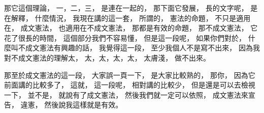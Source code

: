 \hypertarget{w02:cue:2688}{}那它這個理論，
\hypertarget{w02:cue:2689}{}一，二，三，
\hypertarget{w02:cue:2690}{}是連在一起的，
\hypertarget{w02:cue:2691}{}那下面它發展，
\hypertarget{w02:cue:2692}{}長的文字呢，
\hypertarget{w02:cue:2693}{}是在解釋，
\hypertarget{w02:cue:2694}{}什麼情況，
\hypertarget{w02:cue:2695}{}我現在講的這一套，
\hypertarget{w02:cue:2696}{}所謂的，
\hypertarget{w02:cue:2697}{}憲法的命題，
\hypertarget{w02:cue:2698}{}不只是適用在，
\hypertarget{w02:cue:2699}{}成文憲法，
\hypertarget{w02:cue:2700}{}也適用在不成文憲法，
\hypertarget{w02:cue:2701}{}那都是有效的命題，
\hypertarget{w02:cue:2702}{}那不成文憲法，
\hypertarget{w02:cue:2703}{}它花了很長的時間，
\hypertarget{w02:cue:2704}{}這個部分我們不容易懂，
\hypertarget{w02:cue:2705}{}但是這一段呢，
\hypertarget{w02:cue:2706}{}如果你們對於，
\hypertarget{w02:cue:2707}{}什麼叫不成文憲法有興趣的話，
\hypertarget{w02:cue:2708}{}我覺得這一段，
\hypertarget{w02:cue:2709}{}至少我個人不是寫不出來，
\hypertarget{w02:cue:2710}{}因為我對不成文憲法的理解太，
\hypertarget{w02:cue:2711}{}太，太，太，太，
\hypertarget{w02:cue:2712}{}太膚淺，
\hypertarget{w02:cue:2713}{}做不出來。

\hypertarget{w02:cue:2714}{}那至於成文憲法的這一段，
\hypertarget{w02:cue:2715}{}大家誤一頁一下，
\hypertarget{w02:cue:2716}{}是大家比較熟的，
\hypertarget{w02:cue:2717}{}那你，
\hypertarget{w02:cue:2718}{}因為它前面講的比較多了，
\hypertarget{w02:cue:2719}{}這就，
\hypertarget{w02:cue:2720}{}這一段呢，
\hypertarget{w02:cue:2721}{}相對講的比較少，
\hypertarget{w02:cue:2722}{}但是還是可以去檢視一下，
\hypertarget{w02:cue:2723}{}並不是，
\hypertarget{w02:cue:2724}{}就說有了成文憲法，
\hypertarget{w02:cue:2725}{}然後我們就一定可以依照，
\hypertarget{w02:cue:2726}{}成文憲法來宣告，
\hypertarget{w02:cue:2727}{}違憲，
\hypertarget{w02:cue:2728}{}然後說我這樣就是有效。

